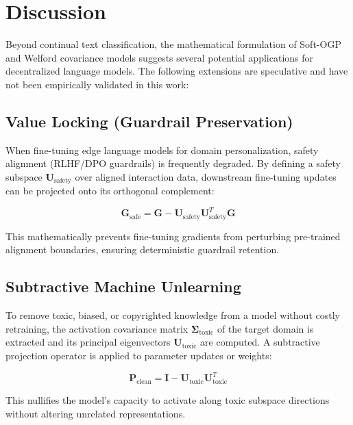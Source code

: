 \documentclass[11pt,a4paper]{article}
\begin{document}
\section{Discussion}

Beyond continual text classification, the mathematical formulation of Soft-OGP and Welford covariance models suggests several potential applications for decentralized language models. The following extensions are speculative and have not been empirically validated in this work:

\subsection{Value Locking (Guardrail Preservation)}

When fine-tuning edge language models for domain personalization, safety alignment (RLHF/DPO guardrails) is frequently degraded. By defining a safety subspace $\mathbf{U}_{\text{safety}}$ over aligned interaction data, downstream fine-tuning updates can be projected onto its orthogonal complement:

\begin{equation}
\mathbf{G}_{\text{safe}} = \mathbf{G} - \mathbf{U}_{\text{safety}} \mathbf{U}_{\text{safety}}^T \mathbf{G}
\end{equation}

This mathematically prevents fine-tuning gradients from perturbing pre-trained alignment boundaries, ensuring deterministic guardrail retention.

\subsection{Subtractive Machine Unlearning}

To remove toxic, biased, or copyrighted knowledge from a model without costly retraining, the activation covariance matrix $\boldsymbol{\Sigma}_{\text{toxic}}$ of the target domain is extracted and its principal eigenvectors $\mathbf{U}_{\text{toxic}}$ are computed. A subtractive projection operator is applied to parameter updates or weights:

\begin{equation}
\mathbf{P}_{\text{clean}} = \mathbf{I} - \mathbf{U}_{\text{toxic}} \mathbf{U}_{\text{toxic}}^T
\end{equation}

This nullifies the model's capacity to activate along toxic subspace directions without altering unrelated representations.
\end{document}
